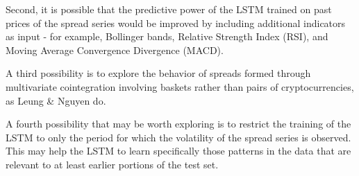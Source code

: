 \documentclass{article}
\begin{document}
Second, it is possible that the predictive power of the LSTM trained on past prices of the spread series would be improved by including additional indicators as input - for example, Bollinger bands, Relative Strength Index (RSI), and Moving Average Convergence Divergence (MACD). 

A third possibility is to explore the behavior of spreads formed through multivariate cointegration involving baskets rather than pairs of cryptocurrencies, as Leung \& Nguyen do. 

A fourth possibility that may be worth exploring is to restrict the training of the LSTM to only the period for which the volatility of the spread series is observed. This may help the LSTM to learn specifically those patterns in the data that are relevant to at least earlier portions of the test set. 



\def\bibsection{\section*{References}}
\scriptsize


\end{document}
